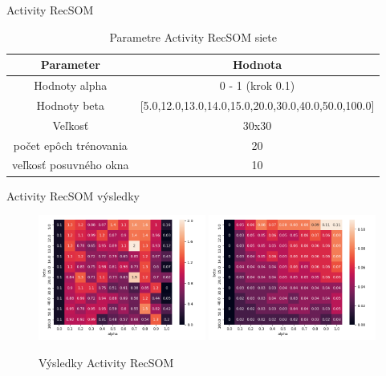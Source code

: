 \documentclass[10pt]{beamer}
\begin{document}
\begin{frame}[fragile]{Activity RecSOM}
\begin{table}[h!]
  \centering
  \begin{tabular}{|c|c|} 
   \hline
   Parameter & Hodnota \\ 
   \hline\hline
   Hodnoty alpha & 0 - 1 (krok 0.1) \\ 
   \hline
   Hodnoty beta & [5.0,12.0,13.0,14.0,15.0,20.0,30.0,40.0,50.0,100.0]\\ 
   \hline
   Veľkosť & 30x30  \\
   \hline
   počet epôch trénovania & 20  \\
   \hline
   veľkosť posuvného okna & 10  \\
   \hline
  \end{tabular}
  \caption{Parametre Activity RecSOM siete}
\end{table}
\end{frame}

\begin{frame}[fragile]{Activity RecSOM výsledky}

  \begin{figure}[H]
   \centering
   \includegraphics[width=0.49\textwidth]{assets/ar_memory_span}
   \includegraphics[width=0.49\textwidth]{assets/ar_errors}
   \caption{Výsledky Activity RecSOM}
 \end{figure}


\end{frame}
\end{document}

